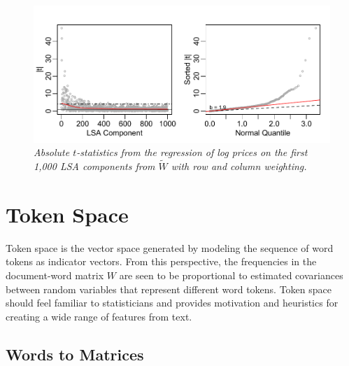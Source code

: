 \documentclass[12pt]{article}
\begin{document}
\begin{figure}
\caption{  \label{fig:lsatstats}  
  {\sl Absolute $t$-statistics from the regression of log prices on the first 1,000 LSA components from $\widetilde{W}$ with row and column weighting.}  }
  \centerline{ \includegraphics[width=5in]{figures/lsa_tstats.pdf} }
\end{figure}



 
\section{Token Space}
\label{sec:tokenspace}

 Token space is the vector space generated by modeling the sequence of word
 tokens as indicator vectors.  From this perspective, the frequencies in the
 document-word matrix $W$ are seen to be proportional to estimated covariances between random variables
 that represent different word tokens. Token space should feel
 familiar to statisticians and provides motivation and heuristics for
 creating a wide range of features from text.


\subsection{Words to Matrices} %
\label{sec:cca}
\end{document}
